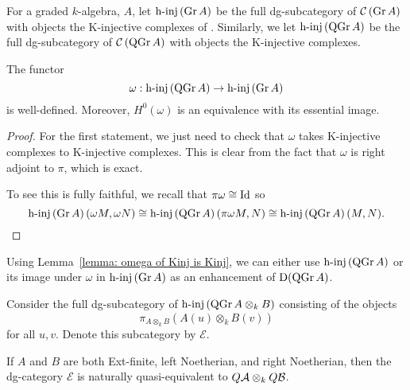 \begin{definition}
  For a graded \(k\)-algebra, \(A\), let \(\operatorname{h-inj}\left(\operatorname{Gr}A\right)\) be the full dg-subcategory of \(\mathcal{C}\left(\operatorname{Gr}A\right)\) with objects the K-injective complexes of \textcite{Spaltenstein88}. Similarly, we let \(\operatorname{h-inj}\left(\operatorname{QGr}A\right)\) be the full dg-subcategory of \(\mathcal{C}\left(\operatorname{QGr}A\right)\) with objects the K-injective complexes.
\end{definition}

\begin{lemma} \label{lemma: omega of Kinj is Kinj}
  The functor 
  \begin{displaymath}
    \omega : \operatorname{h-inj}\left(\operatorname{QGr}A\right) \to \operatorname{h-inj}\left(\operatorname{Gr}A\right)
  \end{displaymath}
  is well-defined. Moreover, \(H^0(\omega)\) is an equivalence with its essential image. 
\end{lemma}

\begin{proof}
  For the first statement, we just need to check that \(\omega\) takes K-injective complexes to K-injective complexes. 
  This is clear from the fact that \(\omega\) is right adjoint to \(\pi\), which is exact.
  
  To see this is fully faithful, we recall that \(\pi \omega \cong \operatorname{Id}\) so
  \[\operatorname{h-inj}\left(\operatorname{Gr}A\right)(\omega M, \omega N) \cong \operatorname{h-inj}\left(\operatorname{QGr}A\right)(\pi\omega M, N) \cong \operatorname{h-inj}\left(\operatorname{QGr}A\right)(M,N).\]
\end{proof}

\begin{remark} \label{remark: enhancement of DQGr}
  Using Lemma~\ref{lemma: omega of Kinj is Kinj}, we can either use \(\operatorname{h-inj}\left(\operatorname{QGr}A\right)\) or its image under \(\omega\) in \(\operatorname{h-inj}\left(\operatorname{Gr}A\right)\) as an enhancement of \(\mathrm{D}(\operatorname{QGr}A)\). 
\end{remark}

Consider the full dg-subcategory of \(\operatorname{h-inj}\left(\operatorname{QGr}A \otimes_k B\right)\) consisting of the objects
\[\pi_{A \otimes_k B} (A(u) \otimes_k B(v))\]
for all \(u,v\). Denote this subcategory by \(\mathcal E\).

\begin{lemma} \label{lemma: another model for QA otimes QB}
If \(A\) and \(B\) are both Ext-finite, left Noetherian, and right Noetherian, then the dg-category \(\mathcal E\) is naturally quasi-equivalent to \(Q \mathcal{A} \otimes_k Q \mathcal{B}\).
\end{lemma}

